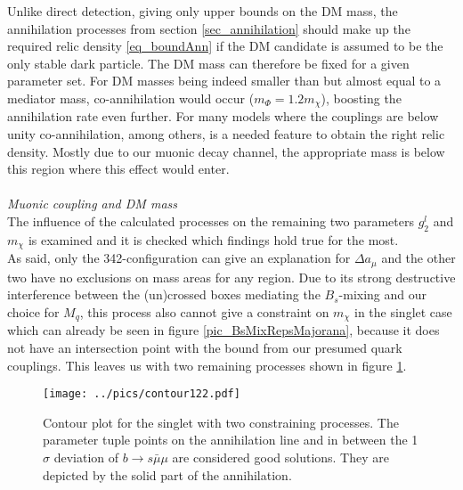 \noindent Unlike direct detection, giving only upper bounds on the DM mass, the annihilation processes from section \ref{sec_annihilation} should
make up the required relic density \eqref{eq_boundAnn} if the DM candidate is assumed to be the only stable dark particle. The DM mass can therefore 
be fixed for a given parameter set.
For DM masses being indeed smaller than but almost equal to a mediator mass,
co-annihilation would occur ($m_\Phi = 1.2 m_\chi$), boosting the annihilation rate even further. For many models where the couplings are below unity
co-annihilation, among others, is a needed feature to obtain the right relic density. Mostly due to our muonic decay channel, the appropriate mass is 
below this region where this effect would enter. 
\\ \\ \textit{Muonic coupling and DM mass}\\
\noindent The influence of the calculated processes on the remaining two parameters $g_2^l$ and $m_\chi$ is examined and it is checked
which findings hold true for the most. \\
\noindent As said, only the 342-configuration can give an explanation for $\Delta a_\mu$ and the other two have no exclusions on mass areas for any 
region. Due to its strong destructive interference between the (un)crossed boxes mediating the $B_s$-mixing and our choice for $M_q$, this process 
also cannot give a constraint on $m_\chi$ in the singlet case which can already be seen in figure \ref{pic_BsMixRepsMajorana}, because it does 
not have an intersection point with the bound from our presumed quark couplings. This leaves us with two remaining processes shown in figure 
\ref{pic_SinRes}. 
\begin{figure}[t]
 \texttt{[image: ../pics/contour122.pdf]}
 \caption{Contour plot for the singlet with two constraining processes. The parameter tuple points on the annihilation line and in between the 
 1 $\sigma$ deviation of $b\rightarrow s\bar\mu\mu$ are considered good solutions. They are depicted by the solid
 part of the annihilation.}
 \label{pic_SinRes}
\end{figure}
